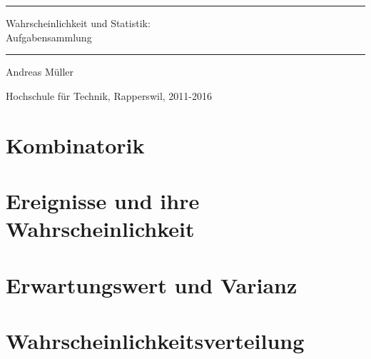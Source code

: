 \documentclass[a4paper,12pt]{book}
\begin{document}
\pagestyle{fancy}
\rhead{}
\frontmatter
\newcommand\HRule{\noindent\rule{\linewidth}{1.5pt}}
\begin{titlepage}
\HRule
\vspace*{2pt}
\begin{flushright}
{\Huge
Wahrscheinlichkeit und Statistik:\\
\bigskip
Aufgabensammlung}
\end{flushright}
\HRule
\begin{flushright}
\vspace{30pt}
\LARGE
Andreas Müller
\end{flushright}
\begin{center}
Hochschule für Technik, Rapperswil, 2011-2016
\end{center}
\end{titlepage}
\hypersetup{
        linktoc=all,
        linkcolor=blue
}
\tableofcontents
\newenvironment{beispiel}[1][Beispiel]{%
\begin{proof}[#1]%
\renewcommand{\qedsymbol}{$\bigcirc$}
}{\end{proof}}
\mainmatter


\chapter{Kombinatorik}

\chapter{Ereignisse und ihre Wahrscheinlichkeit}

%
\chapter{Erwartungswert und Varianz}

\chapter{Wahrscheinlichkeitsverteilung}

\end{document}
